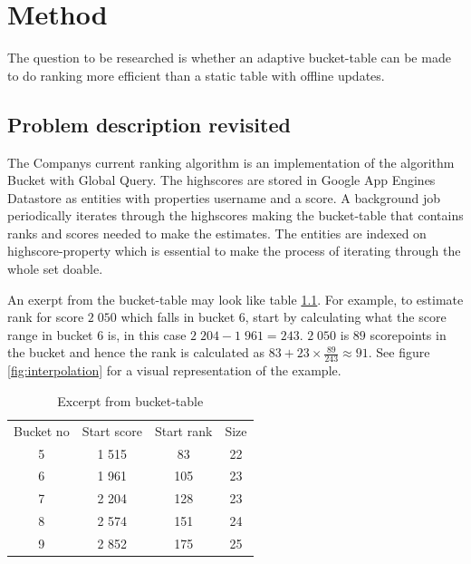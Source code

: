 \chapter{Method}

The question to be researched is whether an adaptive bucket-table can be made to do ranking more efficient than a static table with offline updates.

\section{Problem description revisited}

The Companys current ranking algorithm is an implementation of the algorithm Bucket with Global Query. The highscores are stored in Google App Engines Datastore as entities with properties username and a score. A background job  periodically iterates through the highscores making the bucket-table that contains ranks and scores needed to make the estimates. The entities are indexed on highscore-property which is essential to make the process of iterating through the whole set doable.

An exerpt from the bucket-table may look like table \ref{table:ranking-table}. For example, to estimate rank for score $2\;050$ which falls in bucket 6, start by calculating what the score range in bucket 6 is, in this case $2\;204 - 1\;961 = 243$. $2\;050$ is $89$ scorepoints in the bucket and hence the rank is calculated as $83 + 23 \times \frac{89}{243} \approx 91$. See figure \ref{fig:interpolation} for a visual representation of the example.


\begin{table}[h]
  \begin{center}
  \begin{tabular}{ c c c c }
  Bucket no & Start score & Start rank & Size \\
  5 & 1 515 & 83 & 22 \\ 
  6 & 1 961 & 105 & 23 \\ 
  7 & 2 204 & 128 & 23 \\ 
  8 & 2 574 & 151 & 24 \\  
  9 & 2 852 & 175 & 25 \\ 
\end{tabular}
\caption{Excerpt from bucket-table}
\label{table:ranking-table}
\end{center}
\end{table}

